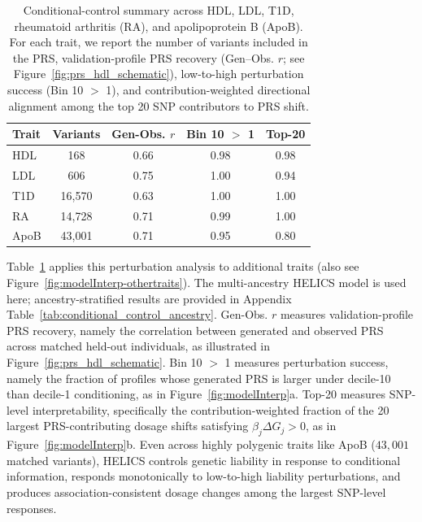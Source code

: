 \documentclass{article}
\begin{document}
\begin{table}
\vspace{-1.0em}
\centering
\caption{
Conditional-control summary across HDL, LDL, T1D, rheumatoid arthritis (RA), and apolipoprotein B (ApoB). 
For each trait, we report the number of variants included in the PRS, validation-profile PRS recovery (Gen--Obs. \(r\); see Figure~\ref{fig:prs_hdl_schematic}), low-to-high perturbation success (Bin 10 \(>\) 1), and contribution-weighted directional alignment among the top 20 SNP contributors to PRS shift.
}
\label{tab:conditional_control}
\scriptsize
\setlength{\tabcolsep}{3pt}
\renewcommand{\arraystretch}{0.95}
\begin{tabular}{lcccc}
\toprule
Trait & Variants & Gen-Obs. \(r\) & Bin 10 \(>\) 1 & Top-20 \\
\midrule
HDL  & 168     & 0.66 & 0.98 & 0.98  \\
LDL  & 606     & 0.75 & 1.00 & 0.94 \\
T1D  & 16{,}570 & 0.63 & 1.00 & 1.00 \\
RA   & 14{,}728 & 0.71 & 0.99 & 1.00  \\
ApoB & 43{,}001 & 0.71 & 0.95 & 0.80 \\
\bottomrule
\end{tabular}
\vspace{-1.0em}
\end{table}
Table~\ref{tab:conditional_control} applies this perturbation analysis to additional traits (also see Figure~\ref{fig:modelInterp-othertraits}). The multi-ancestry HELICS model is used here; ancestry-stratified results are provided in Appendix Table~\ref{tab:conditional_control_ancestry}. Gen-Obs. \(r\) measures validation-profile PRS recovery, namely the correlation between generated and observed PRS across matched held-out individuals, as illustrated in Figure~\ref{fig:prs_hdl_schematic}. Bin 10 \(>\) 1 measures perturbation success, namely the fraction of profiles whose generated PRS is larger under decile-10 than decile-1 conditioning, as in Figure~\ref{fig:modelInterp}a. Top-20 measures SNP-level interpretability, specifically the contribution-weighted fraction of the 20 largest PRS-contributing dosage shifts satisfying \(\beta_j\Delta G_j>0\), as in Figure~\ref{fig:modelInterp}b. Even across highly polygenic traits like ApoB (\(43{,}001\) matched variants), HELICS controls genetic liability in response to conditional information, responds monotonically to low-to-high liability perturbations, and produces association-consistent dosage changes among the largest SNP-level responses.
\end{document}
